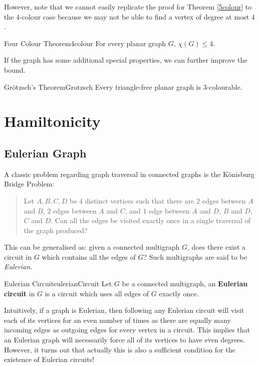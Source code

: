 \documentclass[math]{amznotes}
\theoremstyle{remark}
\newcommand{\0}{\mathbf{0}}
\newcommand{\1}{\mathbf{1}}
\begin{document}
However, note that we cannot easily replicate the proof for Theorem \ref{5colour} to the $4$-colour case because we may not be able to find a vertex of degree at most $4$. 
\begin{thmbox}{Four Colour Theorem}{4colour}
    For every planar graph $G$, $\chi(G) \leq 4$.
\end{thmbox}
If the graph has some additional special properties, we can further improve the bound.
\begin{thmbox}{Gr\"{o}tzsch's Theorem}{Grotzsch}
    Every triangle-free planar graph is $3$-colourable.
\end{thmbox}
\chapter{Hamiltonicity}
\section{Eulerian Graph}
A classic problem regarding graph traversal in connected graphs is the K\"{o}nisburg Bridge Problem:
\begin{quote}
    Let $A, B, C, D$ be $4$ distinct vertices such that there are $2$ edges between $A$ and $B$, $2$ edges between $A$ and $C$, and $1$ edge between $A$ and $D$, $B$ and $D$, $C$ and $D$. Can all the edges be visited exactly once in a single traversal of the graph produced?
\end{quote}
This can be generalised as: given a connected multigraph $G$, does there exist a circuit in $G$ which contains all the edges of $G$? Such multigraphs are said to be \textit{Eulerian}.
\begin{dfnbox}{Eulerian Circuit}{eulerianCircuit}
    Let $G$ be a connected multigraph, an {\color{red} \textbf{Eulerian circuit}} in $G$ is a circuit which uses all edges of $G$ exactly once.
\end{dfnbox}
Intuitively, if a graph is Eulerian, then following any Eulerian circuit will visit each of its vertices for an even number of times as there are equally many incoming edges as outgoing edges for every vertex in a circuit. This implies that an Eulerian graph will necessarily force all of its vertices to have even degrees. However, it turns out that actually this is also a sufficient condition for the existence of Eulerian circuits!
\end{document}
